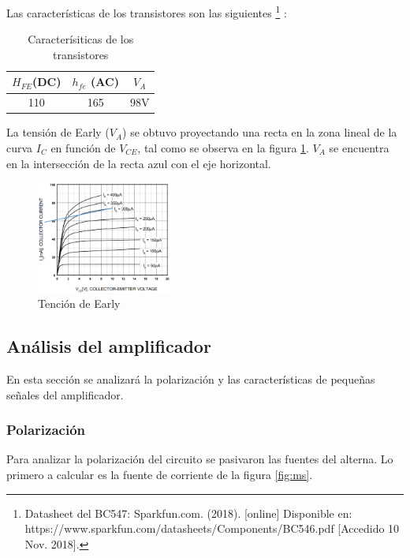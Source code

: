\documentclass[../../main.tex]{subfiles}
\begin{document}
Las caracter\'isticas de los transistores son las siguientes \footnote{Datasheet del BC547: Sparkfun.com. (2018). [online] Disponible en: https://www.sparkfun.com/datasheets/Components/BC546.pdf [Accedido 10 Nov. 2018].} :

\begin{table}[h]
\begin{center}
\begin{tabular}{|c|c|c|}
\hline
$H_{FE}$(DC)& $h_{fe}$ (AC)&$V_A$\\
\hline \hline
110&165 &$98\mathrm{V}$\\ \hline

\end{tabular}
\caption{Caracter\'isiticas de los transistores} \label{tab:qcar}
\end{center}
\end{table}

La tensión de Early ($V_A$) se obtuvo proyectando una recta en la zona lineal de la curva $I_C$ en función de $V_{CE}$, tal como se observa en la figura \ref{fig:vea}. $V_A$ se encuentra en la intersecci\'on de la recta azul con el eje horizontal.

\begin{figure}[H]	
	\centering
	\includegraphics[width=0.4\textwidth]{imagenes/vea.png}
	\caption{Tención de Early}\label{fig:vea}
\end{figure}


\subsection{Análisis del amplificador}
En esta sección se analizar\'a la polarización y las características de pequeñas señales del amplificador.
\subsubsection{Polarización}
Para analizar la polarización del circuito se pasivaron las fuentes del alterna. Lo primero a calcular es la fuente de corriente de la figura \ref{fig:ms}.
\end{document}
